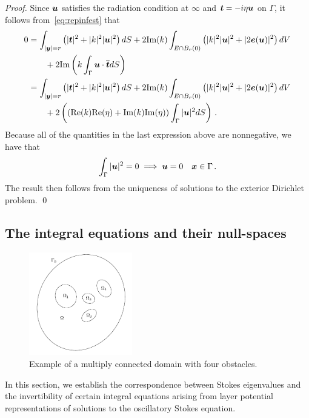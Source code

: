 \begin{proof}
Since ${\boldsymbol u}$ satisfies the radiation condition at $\infty$ and ${\boldsymbol t} = -i\eta {\boldsymbol u}$
on $\Gamma$, it follows from~\cref{eq:repinfest} that
\begin{align*}
0 &=
\int_{|{\boldsymbol y}|=r} \left( |{\boldsymbol t}|^2 + |k|^2 |{\boldsymbol u}|^2 \right) dS +
2 \text{Im}(k) \int_{E \cap B_{r}(0)} \left(|k|^2 |{\boldsymbol u}|^2 + |2{\boldsymbol e}({\boldsymbol u})|^2 \right)
dV \nonumber \\
& \qquad + 2 \text{Im} \left( k \int_{\Gamma} {\boldsymbol u} \cdot \overline{{\boldsymbol t}} dS  \right) \\
&= 
\int_{|{\boldsymbol y}|=r} \left( |{\boldsymbol t}|^2 + |k|^2 |{\boldsymbol u}|^2 \right) dS +
2 \text{Im}(k) \int_{E \cap B_{r}(0)} \left(|k|^2 |{\boldsymbol u}|^2 + |2{\boldsymbol e}({\boldsymbol u})|^2 \right)
dV \nonumber \\
& \qquad + 2 \left( \left ({\rm Re}(k){\rm Re}(\eta) + {\textrm{\textup{Im}}}(k){\textrm{\textup{Im}}}(\eta)
\right ) \int_{\Gamma} |{\boldsymbol u}|^{2} dS  \right)
\, .
\end{align*}
Because all of the quantities in the last expression above are
nonnegative, we have that
\begin{equation}
  \int_{\Gamma} |{\boldsymbol u}|^{2} = 0 \implies {\boldsymbol u} = 0  \quad {\boldsymbol x} \in \Gamma \, .
  \nonumber
\end{equation}
The result then follows from the uniqueness of solutions to the exterior
Dirichlet problem.
\qed
\end{proof}

\subsection{The integral equations and their null-spaces}

\begin{figure}
\begin{center}
\includegraphics[width=0.4\textwidth]{mc_dom}
\end{center}
\caption{Example of a multiply connected domain with four obstacles.}
\label{fig:mc_dom}
\end{figure}

In this section, we establish the correspondence between
Stokes eigenvalues and the invertibility of certain integral
equations arising from layer potential representations
of solutions to the oscillatory Stokes equation.

